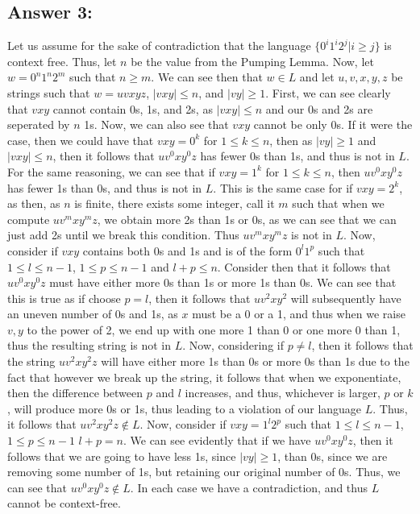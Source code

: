 \documentclass[11pt]{article}
\begin{document}
\subsection*{Answer 3:}
Let us assume for the sake of contradiction that the language $\{0^i1^i2^j | i \geq j\}$ is context free. Thus, let $n$ be the value from the Pumping Lemma. Now, let $w = 0^n1^n2^m$ such that $ n \geq m$. We can see then that $w \in L$ and let $u,v,x,y,z$ be strings such that $w = uvxyz$, $|vxy| \leq n$, and $|vy|\geq 1$. First, we can see clearly that $vxy$ cannot contain 0s, 1s, and 2s, as $|vxy| \leq n$ and our 0s and 2s are seperated by $n$ 1s.
Now, we can also see that $vxy$ cannot be only 0s. If it were the case, then we could have that $vxy=0^k$ for $1\leq k \leq n$, then as  $|vy| \geq 1$ and $|vxy| \leq n$, then it follows that $uv^0xy^0z$ has fewer 0s than 1s, and thus is not in $L$. For the same reasoning, we can see that if $vxy = 1^k$ for $1 \leq k \leq n$, then $uv^0xy^0z$ has fewer 1s than 0s, and thus is not in $L$. This is the same case for if $vxy = 2^k$, as then, as $n$ is finite, there exists some integer, call it $m$ such that when we compute $uv^mxy^mz$, we obtain more 2s than 1s or 0s, as we can see that we can just add 2s until we break this condition. Thus $uv^mxy^mz$ is not in $L$.
Now, consider if $vxy$ contains both 0s and 1s and is of the form $0^l1^p$ such that $1 \leq l \leq n-1$, $1 \leq p \leq n-1$ and $l+p \leq n$. Consider then that it follows that $uv^0xy^0z$ must have either more 0s than 1s or more 1s than 0s. We can see that this is true as if choose $p = l$, then it follows that $uv^2xy^2$ will subsequently have an uneven number of 0s and 1s, as $x$ must be a 0 or a 1, and thus when we raise $v,y$ to the power of 2,
we end up with one more 1 than 0 or one more 0 than 1, thus the resulting string is not in $L$. Now, considering if $p \neq l$, then it follows that the string $uv^2xy^2z$ will have either more 1s than 0s or more 0s than 1s due to the fact that however we break up the string, it follows that when we exponentiate, then the difference between $p$ and $l$ increases, and thus, whichever is larger, $p$ or $k$, will produce more 0s or 1s, thus leading to a violation of our language $L$. Thus, it follows that $uv^2xy^2z \not \in L$. Now, consider if $vxy = 1^l2^p$ such that $1 \leq l \leq n-1$, $1 \leq p \leq n-1$ $l + p = n$. We can see evidently that if we have $uv^0xy^0z$, then it follows
that we are going to have less 1s, since $|vy| \geq 1$, than 0s, since we are removing some number of 1s, but retaining our original number of 0s. Thus, we can see that $uv^0xy^0z \not \in L$.  In each case we have a contradiction, and thus $L$
cannot be context-free.
\end{document}

